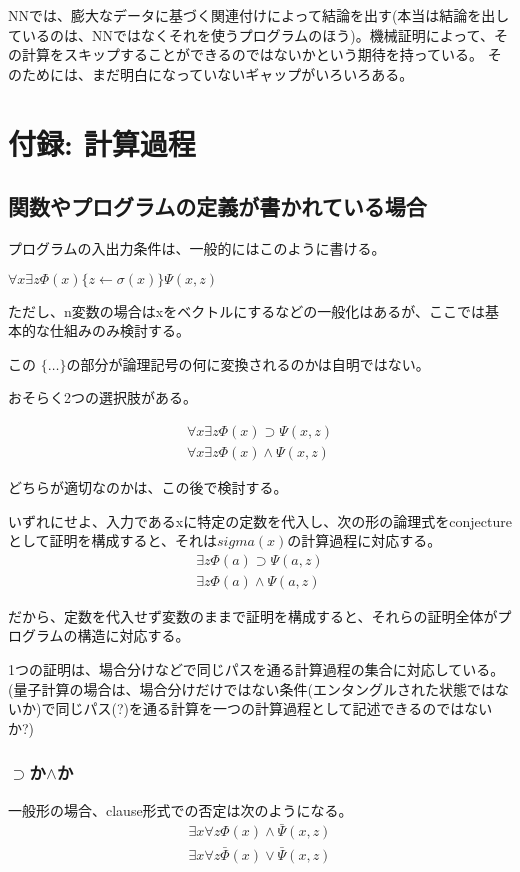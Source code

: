 \documentclass[10pt, oneside]{jarticle}   	%
\begin{document}
NNでは、膨大なデータに基づく関連付けによって結論を出す(本当は結論を出しているのは、NNではなくそれを使うプログラムのほう)。機械証明によって、その計算をスキップすることができるのではないかという期待を持っている。
そのためには、まだ明白になっていないギャップがいろいろある。


\newpage
\section{付録: 計算過程}
\subsection{関数やプログラムの定義が書かれている場合}
プログラムの入出力条件は、一般的にはこのように書ける。

$\forall x \exists z \Phi(x) \{ z \leftarrow \sigma(x) \} \Psi(x,z)$

ただし、n変数の場合はxをベクトルにするなどの一般化はあるが、ここでは基本的な仕組みのみ検討する。

この $\{\dots\}$の部分が論理記号の何に変換されるのかは自明ではない。

おそらく2つの選択肢がある。

\begin{eqnarray}
 \forall x \exists z \Phi(x) \supset \Psi(x,z) \\
 \forall x \exists z \Phi(x) \land \Psi(x,z)
\end{eqnarray}

どちらが適切なのかは、この後で検討する。



いずれにせよ、入力であるxに特定の定数を代入し、次の形の論理式をconjectureとして証明を構成すると、それは$sigma(x)$の計算過程に対応する。
\begin{eqnarray} 
 \exists z \Phi(a) \supset \Psi(a,z) \\
 \exists z \Phi(a) \land \Psi(a,z)
\end{eqnarray}

だから、定数を代入せず変数のままで証明を構成すると、それらの証明全体がプログラムの構造に対応する。

1つの証明は、場合分けなどで同じパスを通る計算過程の集合に対応している。
(量子計算の場合は、場合分けだけではない条件(エンタングルされた状態ではないか)で同じパス(?)を通る計算を一つの計算過程として記述できるのではないか?)


\subsubsection{$\supset$か$\land$か}
一般形の場合、clause形式での否定は次のようになる。
\begin{eqnarray}
 \exists x \forall z \Phi(x) \land \bar{\Psi}(x,z) \\
 \exists x \forall z \bar{\Phi}(x) \lor \bar{\Psi}(x,z)
\end{eqnarray}
\end{document}
